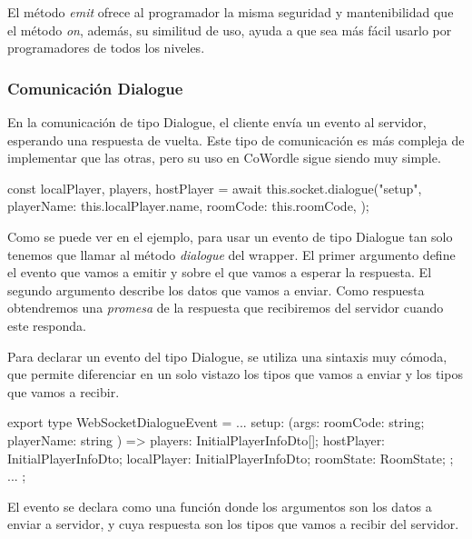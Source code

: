 El método \textit{emit} ofrece al programador la misma seguridad y mantenibilidad que el método \textit{on}, además, su similitud de uso, ayuda a que sea más fácil usarlo por programadores de todos los niveles.

\subsubsection{Comunicación Dialogue}
En la comunicación de tipo Dialogue, el cliente envía un evento al servidor, esperando una respuesta de vuelta. Este tipo de comunicación es más compleja de implementar que las otras, pero su uso en CoWordle sigue siendo muy simple.

\begin{mytypescript}[float={!h},caption={Ejemplo de uso del método \textit{dialogue}.},label={alg:etiqueta}]
	const { localPlayer, players, hostPlayer } = await this.socket.dialogue("setup", {
		playerName: this.localPlayer.name,
		roomCode: this.roomCode,
	});
\end{mytypescript}

Como se puede ver en el ejemplo, para usar un evento de tipo Dialogue tan solo tenemos que llamar al método \textit{dialogue} del wrapper.  El primer argumento define el evento que vamos a emitir y sobre el que vamos a esperar la respuesta. El segundo argumento describe los datos que vamos a enviar. Como respuesta obtendremos una \textit{promesa} de la respuesta que recibiremos del servidor cuando este responda.

Para declarar un evento del tipo Dialogue, se utiliza una sintaxis muy cómoda, que permite diferenciar en un solo vistazo los tipos que vamos a enviar y los tipos que vamos a recibir.

\begin{mytypescript}[float={!h},caption={Ejemplo de declaración del tipo de evento Dialogue.},label={alg:etiqueta}]
	export type WebSocketDialogueEvent = {
		...
		setup: (args: { roomCode: string; playerName: string }) => {
			players: InitialPlayerInfoDto[];
			hostPlayer: InitialPlayerInfoDto;
			localPlayer: InitialPlayerInfoDto;
			roomState: RoomState;
		};
		...
	};
\end{mytypescript}

El evento se declara como una función donde los argumentos son los datos a enviar a servidor, y cuya respuesta son los tipos que vamos a recibir del servidor. 

